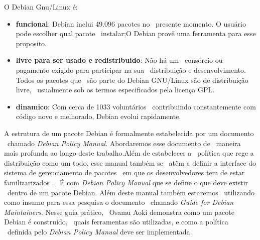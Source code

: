 O Debian Gnu/Linux é:
        \begin{itemize}
        \item \textbf{funcional}: Debian inclui 49.096 pacotes no \
                presente momento. O usuário pode escolher qual pacote \
                instalar;O Debian provê uma ferramenta
                para esse proposito.\cite{Debian}

        \item \textbf{livre para ser usado e redistribuido}: Não há um \
                consórcio ou pagamento exigido para participar na sua \
                distribuição e desenvolvimento.  Todos os pacotes que \
                são parte do Debian GNU/Linux são de distribuição livre, \
                usualmente sob os termos especificados
                pela licença GPL.\cite{Debian}

        \item \textbf{dinamico}: Com cerca de 1033 voluntários \
                contribuindo constantemente com código novo e melhorado,
                Debian evolui rapidamente.\cite{Debian}
        \end{itemize}


A estrutura de um pacote Debian é formalmente estabelecida por um documento \
chamado \textit {Debian Policy Manual}. Abordaremos esse documento de \
maneira mais profunda ao longo deste trabalho.Além de estabelecer a \
política que rege a distribuição como um todo,  esse manual também se \
atêm a definir a interface do sistema de gerenciamento de pacotes \
em que os desenvolvedores tem de estar familizarizados \cite{Guide}. \
É com \textit {Debian Policy Manual} que se define o que deve existir \
dentro de um pacote Debian. Além deste manual também estaremos \
utilizando como insumo para essa pesquisa o documento \
chamado \textit{Guide for Debian Maintainers}. Nesse guia prático, \
Osamu Aoki demonstra como um pacote Debian é construído, \
quais ferramentas são utilizadas, e como a política \
definida pelo \textit{Debian Policy Manual} deve ser implementada.
